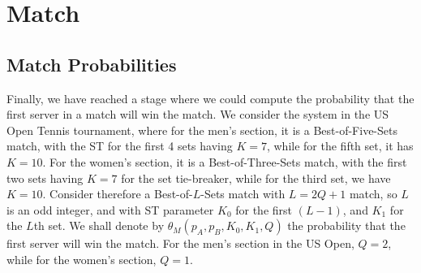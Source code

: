\documentclass[11pt]{article}
\theoremstyle{plain}
\theoremstyle{definition}
\begin{document}
\section{Match}
\label{sec: Match}

\subsection{Match Probabilities}

Finally, we have reached a stage where we could compute the probability that the first server in a match will win the match. We consider the system in the US Open Tennis tournament, where for the men's section, it is a Best-of-Five-Sets match, with the ST for the first 4 sets having $K=7$, while for the fifth set, it has $K=10$. For the women's section, it is a Best-of-Three-Sets match, with the first two sets having $K=7$ for the set tie-breaker, while for the third set, we have $K = 10$.
%
Consider therefore a Best-of-$L$-Sets match with $L=2Q+1$ match, so $L$ is an odd integer, and with ST parameter $K_0$ for the first $(L-1)$, and $K_1$ for the $L$th set. We shall denote by $\theta_M(p_A,p_B,K_0,K_1,Q)$ the probability that the first server will win the match.
%
For the men's section in the US Open, $Q = 2$, while for the women's section, $Q=1$.
\end{document}
